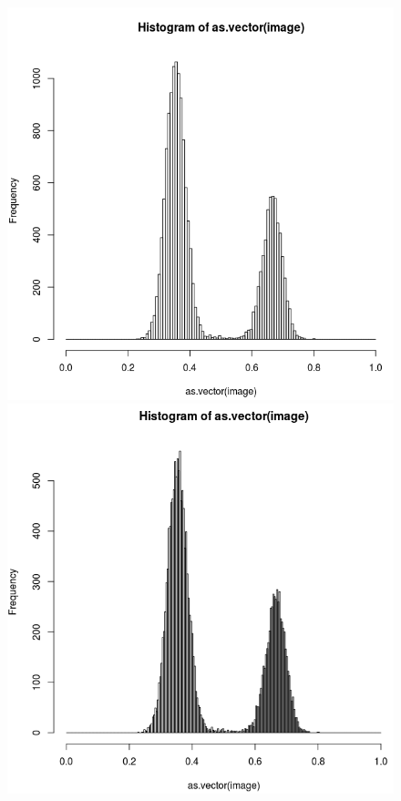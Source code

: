 \documentclass[a4paper,12pt]{report}
\begin{document}
\begin{figure}[!ht]
	\center
	\includegraphics[scale=0.25]{image/128.png}
	\includegraphics[scale=0.25]{image/256.png}

\end{figure}
\end{document}
